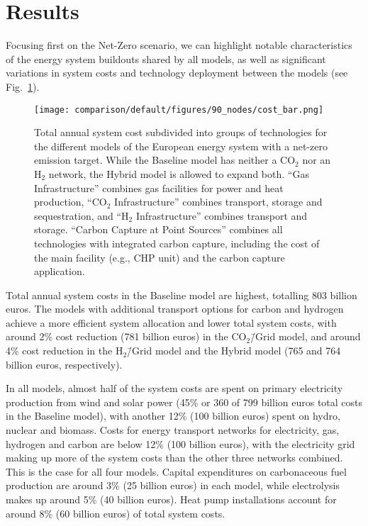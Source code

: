 \documentclass[twocolumn]{article}
\newcommand{\COtwo}{CO$_2$}
\newcommand{\Htwo}{H$_2$}
\newcommand{\modBase}{Baseline model}
\newcommand{\modCO}{CO$_2$\=/Grid model}
\newcommand{\modH}{H$_2$\=/Grid model}
\newcommand{\modHybrid}{Hybrid model}
\begin{document}
\section{Results}
\label{sec:results}


Focusing first on the Net-Zero scenario, we can highlight notable characteristics of the energy system buildouts shared by all models, as well as significant variations in system costs and technology deployment between the models (see Fig.~\ref{fig:cost_bar}).

\begin{figure}[ht!]
    \centering
    \texttt{[image: comparison/default/figures/90\_nodes/cost\_bar.png]}
    \caption[short]{Total annual system cost subdivided into groups of technologies for the different models of the European energy system with a net-zero emission target. While the \modBase{} has neither a \COtwo{} nor an \Htwo{} network, the \modHybrid{} is allowed to expand both. ``Gas Infrastructure'' combines gas facilities for power and heat production, ``\COtwo{} Infrastructure'' combines transport, storage and sequestration, and ``\Htwo{} Infrastructure'' combines transport and storage. ``Carbon Capture at Point Sources'' combines all technologies with integrated carbon capture, including the cost of the main facility (e.g., CHP unit) and the carbon capture application.}
    \label{fig:cost_bar}
\end{figure}

Total annual system costs in the \modBase{} are highest, totalling \label{}803 billion euros. The models with additional transport options for carbon and hydrogen achieve a more efficient system allocation and lower total system costs, with around \label{}2\% cost reduction (\label{}781 billion euros) in the \modCO{}, and around \label{}4\% cost reduction in the \modH{} and the \modHybrid{} (\label{}765 and \label{}764 billion euros, respectively).

In all models, almost half of the system costs are spent on primary electricity production from wind and solar power (\label{}45\% or \label{}360 of \label{}799 billion euros total costs in the \modBase{}), with another \label{}12\% (\label{}100 billion euros) spent on hydro, nuclear and biomass. Costs for energy transport networks for electricity, gas, hydrogen and carbon are below \label{}12\% (\label{}100 billion euros), with the electricity grid making up more of the system costs than the other three networks combined. This is the case for all four models. Capital expenditures on carbonaceous fuel production are around \label{}3\% (\label{}25 billion euros) in each model, while electrolysis makes up around \label{}5\% (\label{}40 billion euros). Heat pump installations account for around \label{}8\% (60 billion euros) of total system costs.
\end{document}
